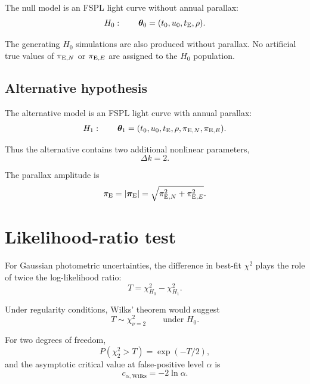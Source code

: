 \documentclass[11pt,a4paper]{article}
\newcommand{\piE}{\boldsymbol{\pi}_{\rm E}}
\newcommand{\pen}{\pi_{{\rm E},N}}
\newcommand{\pee}{\pi_{{\rm E},E}}
\newcommand{\te}{t_{\rm E}}
\newcommand{\rhoFS}{\rho}
\newcommand{\Hnull}{H_0}
\newcommand{\Halt}{H_1}
\begin{document}
The null model is an FSPL light curve without annual parallax:
\begin{equation}
    \Hnull:
    \qquad
    \bm{\theta}_0
    =
    (t_0,u_0,\te,\rhoFS).
\end{equation}

The generating $\Hnull$ simulations are also produced without parallax. No artificial true
values of $\pen$ or $\pee$ are assigned to the $\Hnull$ population.

\subsection{Alternative hypothesis}

The alternative model is an FSPL light curve with annual parallax:
\begin{equation}
    \Halt:
    \qquad
    \bm{\theta}_1
    =
    (t_0,u_0,\te,\rhoFS,\pen,\pee).
\end{equation}

Thus the alternative contains two additional nonlinear parameters,
\begin{equation}
    \Delta k = 2.
\end{equation}

The parallax amplitude is
\begin{equation}
    \pi_{\rm E}
    =
    \left|\piE\right|
    =
    \sqrt{\pen^2+\pee^2}.
\end{equation}

\section{Likelihood-ratio test}

For Gaussian photometric uncertainties, the difference in best-fit $\chi^2$ plays the role of
twice the log-likelihood ratio:
\begin{equation}
    T
    =
    \chi^2_{\Hnull}
    -
    \chi^2_{\Halt}.
\end{equation}

Under regularity conditions, Wilks' theorem would suggest
\begin{equation}
    T \sim \chi^2_{\nu=2}
    \qquad
    \text{under }\Hnull.
\end{equation}

For two degrees of freedom,
\begin{equation}
    P(\chi^2_2 > T)
    =
    \exp(-T/2),
\end{equation}
and the asymptotic critical value at false-positive level $\alpha$ is
\begin{equation}
    c_{\alpha,\mathrm{Wilks}}
    =
    -2\ln\alpha.
\end{equation}
\end{document}
